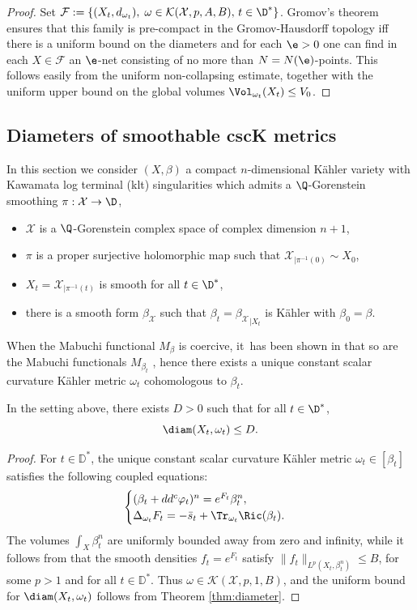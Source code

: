 \begin{proof}
Set ${\mathcal F}:=\{ (X_t,d_{\omega_t}), \; \omega \in {\mathcal K}(\mathcal{X},p,A,B), \, t \in \D^* \}$.
Gromov's theorem \cite[Th.\,7.4.15]{BBI01} ensures that this family is pre-compact in the Gromov-Hausdorff
topology iff there is a uniform bound on the diameters and for each $\e>0$
one can find in each $X \in {\mathcal F}$ an $\e$-net consisting of no more than
$N=N(\e)$-points. This follows easily from the uniform non-collapsing estimate, together
with the uniform upper bound on the global volumes $\Vol_{\omega_t}(X_t) \leq V_0$.
\end{proof}

\subsection{Diameters of smoothable cscK metrics} \label{sec:csck}

In this section we consider $(X,\beta)$ a compact $n$-dimensional Kähler variety with Kawamata log terminal (klt) singularities
which admits a $\Q$-Gorenstein smoothing
$\pi: {\mathcal X} \rightarrow \D$, \ie
\begin{itemize}
\item ${\mathcal X}$ is a $\Q$-Gorenstein complex space of complex dimension $n+1$,
\item $\pi$ is a proper surjective holomorphic map such that ${\mathcal X}_{|\pi^{-1}(0)} \sim X_0$,
\item $X_t={\mathcal X}_{|\pi^{-1}(t)}$ is smooth for all $t \in \D^*$,
\item there is a smooth form $\beta_{{\mathcal X}}$ such that
$\beta_t={\beta_{{\mathcal X}}}_{|X_t}$ is Kähler with $\beta_0=\beta$.
\end{itemize}

When the Mabuchi functional $M_{\beta}$ is coercive, it~has been shown in \cite[Th.\,C]{PTT23} that
so are the Mabuchi functionals $M_{\beta_t}$ , hence
there exists a unique constant scalar curvature Kähler metric $\omega_t$ cohomologous to $\beta_t$.

\begin{coro} \label{cor:csck}
In the setting above, there exists $D>0$ such that for all $t \in \D^*$,
\[
\diam(X_t,\omega_t) \leq D.
\]
\end{coro}

\begin{proof}
For $t\in \mathbb{D}^* $, the unique constant scalar curvature Kähler metric $\omega_t\in [\beta_t]$
satisfies the following coupled equations:
\[
\begin{cases}
(\beta_t+ dd^c \varphi_t)^n = e^{F_t} \beta_t^n, \\
\Delta_{\omega_t} F_t= -\bar s_t + \Tr_{\omega_t} \Ric(\beta_t).
\end{cases}
\]
The volumes $\int_X \beta_t^n$ are uniformly bounded away from zero and infinity, while
it follows from \cite[Th.\,5.3]{PTT23} that
the smooth densities $f_t\!=\!e^{F_t}$
satisfy \hbox{$\|f_t\|_{L^p(X_t, \beta_t^n)} \!\leq\! B$}, for some $p>1$ and for all $t\in \mathbb{D}^*$.
Thus $\omega\in {\mathcal K}(\mathcal{X},p,1,B)$, and the uniform bound for $\diam(X_t, \omega_t) $ follows from Theorem \ref{thm:diameter}.
\end{proof}

